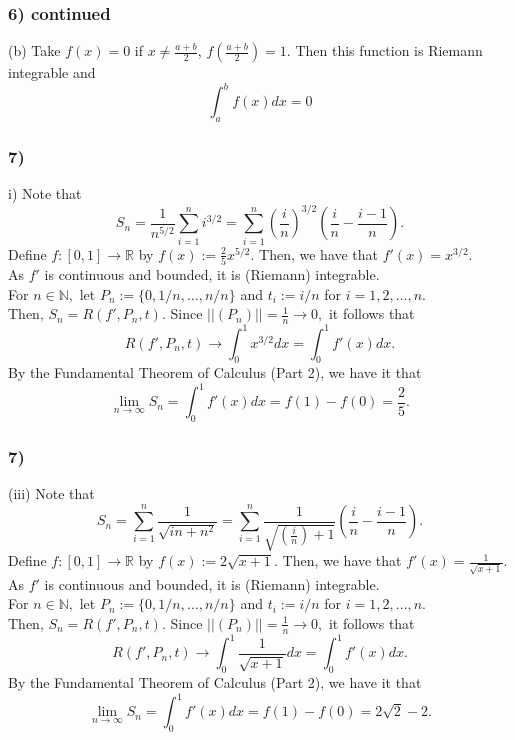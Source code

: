 \documentclass[handout]{beamer}
\begin{document}
\begin{frame}
	\frametitle{6) continued}
	(b) Take $f(x)=0$ if $x\neq \frac{a+b}{2}$, $f(\frac{a+b}{2})=1$. Then this function is Riemann integrable and
	$$\int_{a}^{b}f(x)dx =0 $$
\end{frame}

\begin{frame}
	\frametitle{7)}
	i) Note that \\
	\[S_n = \dfrac{1}{n^{5/2}}\displaystyle\sum_{i=1}^{n}i^{3/2} = \sum_{i=1}^{n}\left(\dfrac{i}{n}\right)^{3/2}\left(\dfrac{i}{n} - \dfrac{i-1}{n}\right).\]
	Define $f:[0, 1] \to \mathbb{R}$ by $f(x) := \frac{2}{5}x^{5/2}.$ Then, we have that $f'(x) = x^{3/2}.$\\
	As $f'$ is continuous and bounded, it is (Riemann) integrable. \\
	For $n \in \mathbb{N},$ let $P_n := \{0, 1/n, \ldots, n/n\}$ and $t_i := i/n$ for $i = 1, 2, \ldots, n.$\\
	Then, $S_n = R(f',P_n,t).$ Since $||(P_n)|| = \frac{1}{n} \to 0,$ it follows that
	\[R(f',P_n,t) \to \int_{0}^{1} x^{3/2} dx = \int_{0}^{1} f'(x) dx. \]
	By the Fundamental Theorem of Calculus (Part 2), we have it that
	\[\lim_{n\to \infty}S_n = \int_{0}^{1} f'(x) dx = f(1) - f(0) = \dfrac{2}{5}.\]

\end{frame}


\begin{frame}
	\frametitle{7)}
	(iii) Note that \\
	\[S_n = \sum_{i=1}^{n}\dfrac{1}{\sqrt{in + n^2}} = \sum_{i=1}^{n}\dfrac{1}{\sqrt{\left(\frac{i}{n}\right) + 1}}\left(\frac{i}{n} - \frac{i-1}{n}\right) .\]
	Define $f:[0, 1] \to \mathbb{R}$ by $f(x) := 2\sqrt{x + 1}.$ Then, we have that $f'(x) = \frac{1}{\sqrt{x+ 1}}.$\\
	As $f'$ is continuous and bounded, it is (Riemann) integrable. \\
	For $n \in \mathbb{N},$ let $P_n := \{0, 1/n, \ldots, n/n\}$ and $t_i := i/n$ for $i = 1, 2, \ldots, n.$\\
	Then, $S_n = R(f',P_n,t).$ Since $||(P_n)|| = \frac{1}{n} \to 0,$ it follows that
	\[R(f',P_n,t) \to \int_{0}^{1} \frac{1}{\sqrt{x+ 1}} dx = \int_{0}^{1} f'(x) dx. \]
	By the Fundamental Theorem of Calculus (Part 2), we have it that
	\[\lim_{n\to \infty}S_n = \int_{0}^{1} f'(x) dx = f(1) - f(0) = 2\sqrt{2} - 2.\]

\end{frame}
\end{document}
